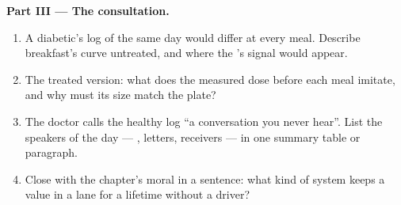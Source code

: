 \begin{problem}
\medskip\noindent\textbf{Part III --- The consultation.}
\begin{enumerate}[resume]
  \item A diabetic's log of the same day would differ
        at every meal. Describe breakfast's curve
        untreated, and where the 's signal would
        appear.
  \item The treated version: what does the measured
        dose before each meal imitate, and why must
        its size match the plate?
  \item The doctor calls the healthy log ``a
        conversation you never hear''. List the
        speakers of the day --- , letters,
        receivers --- in one summary table or
        paragraph.
  \item Close with the chapter's moral in a sentence:
        what kind of system keeps a value in a lane
        for a lifetime without a driver?
\end{enumerate}
\end{problem}
